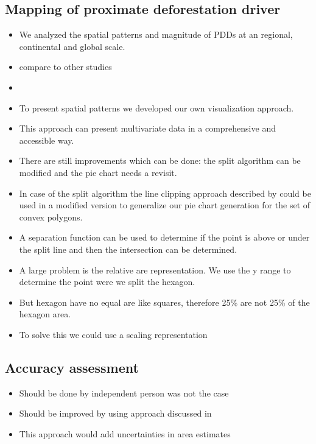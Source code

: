 		\subsection{Mapping of proximate deforestation driver}
		\label{subsec:discussion_proxy_deforestation_driver}
			\begin{itemize}
				\item We analyzed the spatial patterns and magnitude of PDDs at an regional, continental and global scale.
				\item compare to other studies
				\item 
				\item To present spatial patterns we developed our own visualization approach.
				\item This approach can present multivariate data in a comprehensive and accessible way.
				\item There are still improvements which can be done: the split algorithm can be modified and the pie chart needs a revisit.
				\item In case of the split algorithm the line clipping approach described by \citep{Skala1994} could be used in a modified version to generalize our pie chart generation for the set of convex polygons.
				\item A separation function can be used to determine if the point is above or under the split line and then the intersection can be determined.
				\item A large problem is the relative are representation. We use the y range to determine the point were we split the hexagon.
				\item But hexagon have no equal are like squares, therefore 25\% are not 25\% of the hexagon area.
				\item To solve this we could use a scaling representation
			\end{itemize}

		\subsection{Accuracy assessment}
		\label{subsec:discussion_accuracy_assessment}
			\begin{itemize}
				\item Should be done by independent person was not the case
				\item Should be improved by using approach discussed in \citep{Olofsson2014}
				\item This approach would add uncertainties in area estimates
			\end{itemize}

